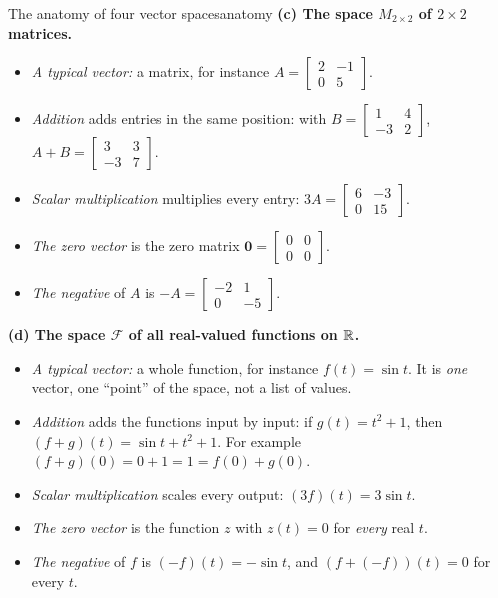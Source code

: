 \documentclass[11pt]{article}
\begin{document}
\begin{exmp}{The anatomy of four vector spaces}{anatomy}
\textbf{(c) The space $M_{2\times2}$ of $2\times2$ matrices.}
\begin{itemize}[itemsep=1pt]
  \item \emph{A typical vector:} a matrix, for instance $A=\begin{bmatrix}2&-1\\0&5\end{bmatrix}$.
  \item \emph{Addition} adds entries in the same position: with $B=\begin{bmatrix}1&4\\-3&2\end{bmatrix}$, $A+B=\begin{bmatrix}3&3\\-3&7\end{bmatrix}$.
  \item \emph{Scalar multiplication} multiplies every entry: $3A=\begin{bmatrix}6&-3\\0&15\end{bmatrix}$.
  \item \emph{The zero vector} is the zero matrix $\mathbf{0}=\begin{bmatrix}0&0\\0&0\end{bmatrix}$.
  \item \emph{The negative} of $A$ is $-A=\begin{bmatrix}-2&1\\0&-5\end{bmatrix}$.
\end{itemize}
\textbf{(d) The space $\mathcal{F}$ of all real-valued functions on $\mathbb{R}$.}
\begin{itemize}[itemsep=1pt]
  \item \emph{A typical vector:} a whole function, for instance $f(t)=\sin t$. It is \emph{one} vector, one ``point'' of the space, not a list of values.
  \item \emph{Addition} adds the functions input by input: if $g(t)=t^2+1$, then $(f+g)(t)=\sin t+t^2+1$. For example $(f+g)(0)=0+1=1=f(0)+g(0)$.
  \item \emph{Scalar multiplication} scales every output: $(3f)(t)=3\sin t$.
  \item \emph{The zero vector} is the function $z$ with $z(t)=0$ for \emph{every} real $t$.
  \item \emph{The negative} of $f$ is $(-f)(t)=-\sin t$, and $(f+(-f))(t)=0$ for every $t$.
\end{itemize}
\end{exmp}
\end{document}
